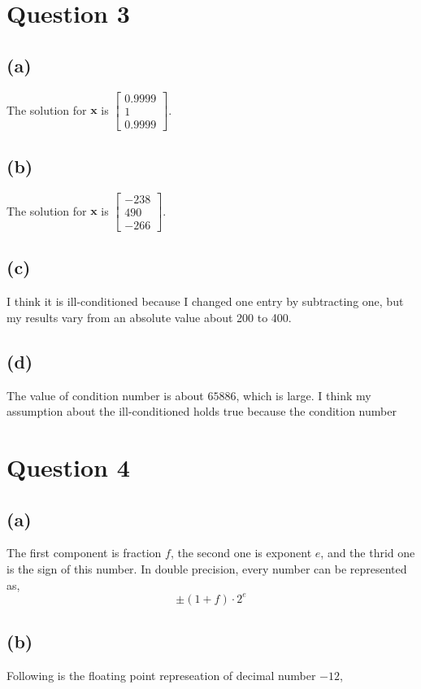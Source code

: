 \documentclass{article}
\newcommand{\bmat}[1]{\begin{bmatrix} #1 \end{bmatrix}}
\newcommand{\mat}[1]{\mathbf{#1}}
\begin{document}
\section*{Question 3}

\subsection*{(a)}
The solution for $\mat{x}$ is $\bmat{0.9999\\1\\0.9999}$.

\subsection*{(b)}
The solution for $\mat{x}$ is $\bmat{-238\\490\\-266}$.


\subsection*{(c)}
I think it is ill-conditioned because I changed one entry by subtracting
one, but my results vary from an absolute value about 200 to 400.


\subsection*{(d)}
The value of condition number is about $65886$, which is large. I think my assumption about
the ill-conditioned holds true because the condition number 




\section*{Question 4}

\subsection*{(a)}
The first component is fraction $f$, the second one is exponent $e$, and the thrid one 
is the sign of this number. In double precision, every number can be represented as,
$$\pm (1+f) \cdot 2^{e}$$


\subsection*{(b)}

Following is the floating point represeation of decimal number $-12$,
\end{document}
